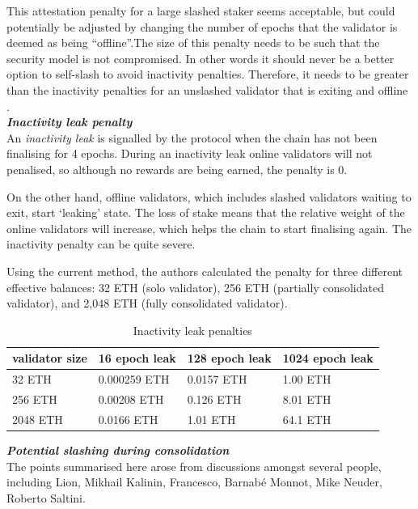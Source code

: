 This attestation penalty for a large slashed staker seems acceptable, but could potentially be adjusted by changing the number of epochs that the validator is deemed as being ``offline''.The size of this penalty needs to be such that the security model is not compromised. In other words it should never be a better option to self-slash to avoid inactivity penalties. Therefore, it needs to be greater than the inactivity penalties for an unslashed validator that is exiting and offline \cite{Neuder2023d}. \\

\noindent
\textbf{\textit{Inactivity leak penalty}} \\
An \textit{inactivity leak} is signalled by the protocol when the chain has not been finalising for 4 epochs. During an inactivity leak online validators will not penalised, so although no rewards are being earned, the penalty is 0. 

On the other hand, offline validators, which includes slashed validators waiting to exit, start `leaking' state. The loss of stake means that the relative weight of the online validators will increase, which helps the chain to start finalising again. The inactivity penalty can be quite severe. 

Using the current method, the authors calculated the penalty for three different effective balances: 32 ETH (solo validator), 256 ETH (partially consolidated validator),  and 2,048 ETH (fully consolidated validator).

\begin{table}[htp]
\caption{Inactivity leak penalties}
\begin{center}
\renewcommand{\arraystretch}{1.3}
\begin{tabular}{|l|l|l|l|}
\hline
\textbf{validator size} & \textbf{16 epoch leak} & \textbf{128 epoch leak} & \textbf{1024 epoch leak} \\
\hline
32 ETH & 0.000259 ETH & 0.0157 ETH & 1.00 ETH \\
256 ETH & 0.00208 ETH & 0.126 ETH & 8.01 ETH \\
2048 ETH & 0.0166 ETH & 1.01 ETH & 64.1 ETH \\
\hline
\end{tabular}
\end{center}
\label{default}
\end{table}%

\noindent
\textbf{\textit{Potential slashing during consolidation}} \\
The points summarised here arose from discussions amongst several people, including Lion, Mikhail Kalinin, Francesco, Barnabé Monnot, Mike Neuder, Roberto Saltini.

